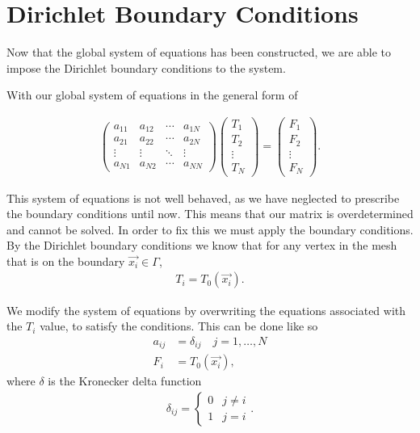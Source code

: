 \documentclass[../fem.tex]{subfiles}
\begin{document}
\section{Dirichlet Boundary Conditions}%
\label{sec:dirichlet_boundary_conditions}

Now that the global system of equations has been constructed, we are able to
impose the Dirichlet boundary conditions to the system.

With our global system of equations in the general form of

\begin{align}\label{eq:global_sys}
  \begin{pmatrix}
    a_{11} & a_{12} & \cdots & a_{1N}\\
    a_{21} & a_{22} & \cdots & a_{2N}\\
    \vdots & \vdots & \ddots & \vdots \\
    a_{N1} & a_{N2} & \cdots & a_{NN}
  \end{pmatrix}
  \begin{pmatrix}
    T_1 \\ T_2 \\ \vdots \\ T_N
  \end{pmatrix}
  =
  \begin{pmatrix}
    F_1 \\ F_2 \\ \vdots \\ F_N
  \end{pmatrix}.
\end{align}

This system of equations is not well behaved, as we have neglected to prescribe
the boundary conditions until now. This means that our matrix is overdetermined
and cannot be solved. In order to fix this we must apply the boundary
conditions. By the Dirichlet boundary conditions we know that for any vertex in
the mesh that is on the boundary $\vec{x_i}\in\Gamma$,
\begin{align*}
  T_i=T_0(\vec{x_i}).
\end{align*}

We modify the system of equations by overwriting the equations associated with
the $T_i$ value, to satisfy the conditions. This can be done like so
\begin{align*}
  a_{ij}&=\delta_{ij}\quad j=1,\ldots,N\\
  F_i&=T_0(\vec{x_i}),
\end{align*}
where $\delta$ is the Kronecker delta function
\begin{align*}
  \delta_{ij}=\begin{cases}
    0 & j\neq i\\
    1 & j = i
  \end{cases}.
\end{align*}
\end{document}
